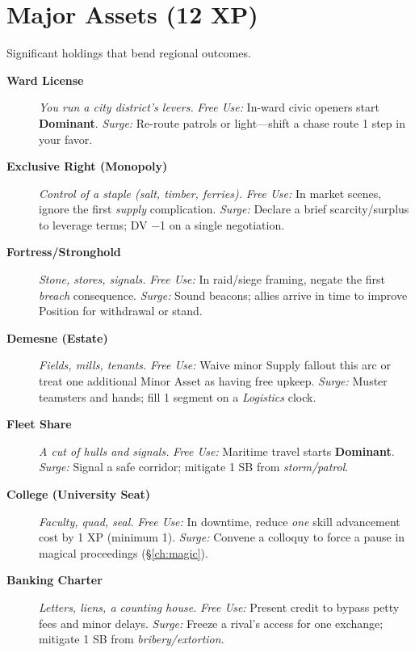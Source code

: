 \section{Major Assets (12 XP)}
Significant holdings that bend regional outcomes.
\begin{description}
  \item[\textbf{Ward License}]  \emph{You run a city district's levers.} \emph{Free Use:} In-ward civic openers start \textbf{Dominant}. \emph{Surge:} Re-route patrols or light—shift a chase route 1 step in your favor.

  \item[\textbf{Exclusive Right (Monopoly)}]  \emph{Control of a staple (salt, timber, ferries).} \emph{Free Use:} In market scenes, ignore the first \emph{supply} complication. \emph{Surge:} Declare a brief scarcity/surplus to leverage terms; DV −1 on a single negotiation.

  \item[\textbf{Fortress/Stronghold}]  \emph{Stone, stores, signals.} \emph{Free Use:} In raid/siege framing, negate the first \emph{breach} consequence. \emph{Surge:} Sound beacons; allies arrive in time to improve Position for withdrawal or stand.

  \item[\textbf{Demesne (Estate)}]  \emph{Fields, mills, tenants.} \emph{Free Use:} Waive minor Supply fallout this arc or treat one additional Minor Asset as having free upkeep. \emph{Surge:} Muster teamsters and hands; fill 1 segment on a \emph{Logistics} clock.

  \item[\textbf{Fleet Share}]  \emph{A cut of hulls and signals.} \emph{Free Use:} Maritime travel starts \textbf{Dominant}. \emph{Surge:} Signal a safe corridor; mitigate 1 SB from \emph{storm/patrol}.

  \item[\textbf{College (University Seat)}]  \emph{Faculty, quad, seal.} \emph{Free Use:} In downtime, reduce \emph{one} skill advancement cost by 1 XP (minimum 1). \emph{Surge:} Convene a colloquy to force a pause in magical proceedings (\S\ref{ch:magic}).

  \item[\textbf{Banking Charter}]  \emph{Letters, liens, a counting house.} \emph{Free Use:} Present credit to bypass petty fees and minor delays. \emph{Surge:} Freeze a rival's access for one exchange; mitigate 1 SB from \emph{bribery/extortion}.


\end{description}

